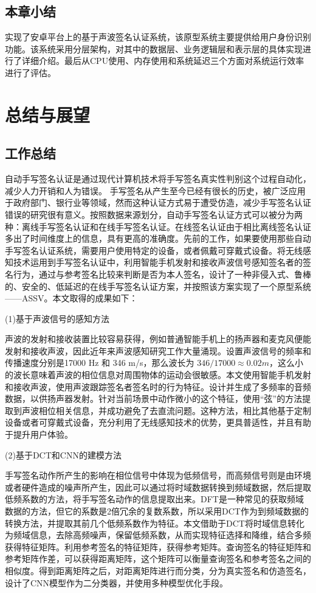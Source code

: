 \section{本章小结}
实现了安卓平台上的基于声波签名认证系统，该原型系统主要提供给用户身份识别功能。该系统采用分层架构，对其中的数据层、业务逻辑层和表示层的具体实现进行了详细介绍。最后从CPU使用、内存使用和系统延迟三个方面对系统运行效率进行了评估。

\chapter{总结与展望}
\section{工作总结}
自动手写签名认证是通过现代计算机技术将手写签名真实性判别这个过程自动化，减少人力开销和人为错误。 手写签名从产生至今已经有很长的历史，被广泛应用于政府部门、银行业等领域，然而这种认证方式易于遭受仿造，减少手写签名认证错误的研究很有意义。按照数据来源划分，自动手写签名认证方式可以被分为两种：离线手写签名认证和在线手写签名认证。在线签名认证由于相比离线签名认证多出了时间维度上的信息，具有更高的准确度。先前的工作，如果要使用那些自动手写签名认证系统，需要用户使用特定的设备，或者佩戴可穿戴式设备。将无线感知技术运用到手写签名认证中，利用智能手机发射和接收声波信号感知签名者的签名行为，通过与参考签名比较来判断是否为本人签名，设计了一种非侵入式、鲁棒的、安全的、低延迟的在线手写签名认证方案，并按照该方案实现了一个原型系统——ASSV。本文取得的成果如下：

(1)基于声波信号的感知方法

声波的发射和接收装置比较容易获得，例如普通智能手机上的扬声器和麦克风便能发射和接收声波，因此近年来声波感知研究工作大量涌现。设置声波信号的频率和传播速度分别是17000 Hz 和 346 m/s，那么波长为  $346/17000\approx0.02m$，这么小的波长意味着声波的相位信息对周围物体的运动会很敏感。本文使用智能手机发射和接收声波，使用声波跟踪签名者签名时的行为特征。设计并生成了多频率的音频数据，以供扬声器发射。针对当前场景中动作微小的这个特征，使用“弦”的方法提取到声波相位相关信息，并成功避免了去直流问题。这种方法，相比其他基于定制设备或者可穿戴式设备，充分利用了无线感知技术的优势，更具普适性，并且有助于提升用户体验。

(2)基于DCT和CNN的建模方法

手写签名动作所产生的影响在相位信号中体现为低频信号，而高频信号则是由环境或者硬件造成的噪声所产生，因此可以通过将时域数据转换到频域数据，然后提取低频系数的方法，将手写签名动作的信息提取出来。DFT是一种常见的获取频域数据的方法，但它的系数是2倍冗余的复数系数，所以采用DCT作为到频域数据的转换方法，并提取其前几个低频系数作为特征。本文借助于DCT将时域信息转化为频域信息，去除高频噪声，保留低频系数，从而实现特征选择和降维，结合多频获得特征矩阵。利用参考签名的特征矩阵，获得参考矩阵。查询签名的特征矩阵和参考矩阵作差，可以获得距离矩阵，这个矩阵可以衡量查询签名和参考签名之间的相似度。得到距离矩阵之后，对距离矩阵进行而分类，分为真实签名和仿造签名，设计了CNN模型作为二分类器，并使用多种模型优化手段。

